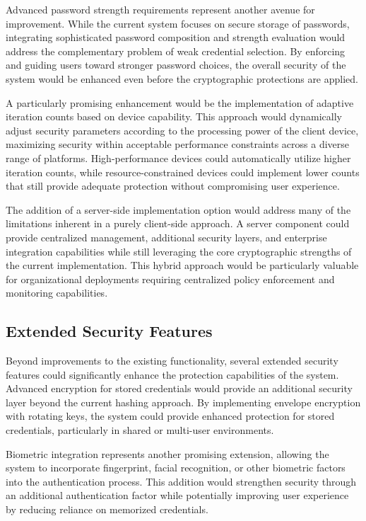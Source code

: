 \documentclass[11pt,a4paper]{article}
\begin{document}
Advanced password strength requirements represent another avenue for improvement. While the current system focuses on secure storage of passwords, integrating sophisticated password composition and strength evaluation would address the complementary problem of weak credential selection. By enforcing and guiding users toward stronger password choices, the overall security of the system would be enhanced even before the cryptographic protections are applied.

A particularly promising enhancement would be the implementation of adaptive iteration counts based on device capability. This approach would dynamically adjust security parameters according to the processing power of the client device, maximizing security within acceptable performance constraints across a diverse range of platforms. High-performance devices could automatically utilize higher iteration counts, while resource-constrained devices could implement lower counts that still provide adequate protection without compromising user experience.

The addition of a server-side implementation option would address many of the limitations inherent in a purely client-side approach. A server component could provide centralized management, additional security layers, and enterprise integration capabilities while still leveraging the core cryptographic strengths of the current implementation. This hybrid approach would be particularly valuable for organizational deployments requiring centralized policy enforcement and monitoring capabilities.
\subsection{Extended Security Features}
Beyond improvements to the existing functionality, several extended security features could significantly enhance the protection capabilities of the system. Advanced encryption for stored credentials would provide an additional security layer beyond the current hashing approach. By implementing envelope encryption with rotating keys, the system could provide enhanced protection for stored credentials, particularly in shared or multi-user environments.

Biometric integration represents another promising extension, allowing the system to incorporate fingerprint, facial recognition, or other biometric factors into the authentication process. This addition would strengthen security through an additional authentication factor while potentially improving user experience by reducing reliance on memorized credentials.
\end{document}
